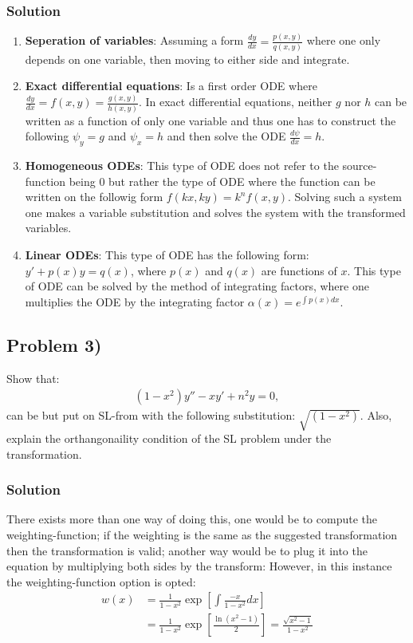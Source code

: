 \subsubsection*{Solution}
\begin{enumerate}
    \item \textbf{Seperation of variables}: Assuming a form $\frac{dy}{dx} = \frac{p(x,y)}{q(x,y)}$ where one only depends on one variable, then moving to either side and integrate.  
    \item \textbf{Exact differential equations}: Is a first order ODE where $\frac{dy}{dx} = f(x,y) = \frac{g(x,y)}{h(x,y)}$. In exact differential equations, neither $g$ nor $h$ can be written as a function of only one variable and thus one has to construct the following $\psi_y = g$ and $\psi_x = h$ and then solve the ODE $\frac{d\psi}{dx} = h$.
    \item \textbf{Homogeneous ODEs}: This type of ODE does not refer to the source-function being $0$ but rather the type of ODE where the function can be written on the followig form $f(kx,ky)=k^nf(x,y)$. Solving such a system one makes a variable substitution and solves the system with the transformed variables.
    \item \textbf{Linear ODEs}: This type of ODE has the following form: $y' + p(x)y = q(x)$, where $p(x)$ and $q(x)$ are functions of $x$. This type of ODE can be solved by the method of integrating factors, where one multiplies the ODE by the integrating factor $\alpha(x) = e^{\int p(x)dx}$.
\end{enumerate}

\subsection*{Problem 3)}
Show that:
\begin{align*}
    (1-x^2)y'' -xy' +n^2y = 0,
\end{align*}can be but put on SL-from with the following substitution: $\sqrt{(1-x^2)}$. Also, explain the orthangonaility condition of the SL problem under the transformation.

\subsubsection*{Solution}
There exists more than one way of doing this, one would be to compute the weighting-function; if the weighting is the same as the suggested transformation then the transformation is valid; another way would be to plug it into the equation by multiplying both sides by the transform:
However, in this instance the weighting-function option is opted:
\begin{align*}
    w(x) &= \frac{1}{1-x^2}\exp\left[\int \frac{-x}{1-x^2}dx\right]\\
    &= \frac{1}{1-x^2}\exp\left[\frac{\ln(x^2 -1)}{2}\right] = \frac{\sqrt{x^2 -1}}{1-x^2}\\
\end{align*}

